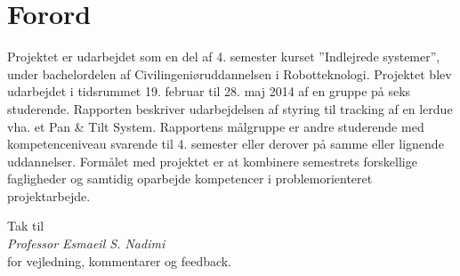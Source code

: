 \section*{Forord}
Projektet er udarbejdet som en del af 4. semester kurset ”Indlejrede systemer”, under bachelordelen af Civilingeniøruddannelsen i Robotteknologi. 
Projektet blev udarbejdet i tidsrummet 19. februar til 28. maj 2014 af en gruppe på seks studerende.
Rapporten beskriver udarbejdelsen af styring til tracking af en lerdue vha. et Pan \& Tilt System.
Rapportens målgruppe er andre studerende med kompetenceniveau svarende til 4. semester eller derover på samme eller lignende uddannelser.
Formålet med projektet er at kombinere semestrets forskellige fagligheder og samtidig oparbejde kompetencer i problemorienteret projektarbejde.
\bigskip
\begin{center}
Tak til \\
\textit{Professor Esmaeil S. Nadimi} \\ 
for vejledning, kommentarer og feedback.
\end{center}





